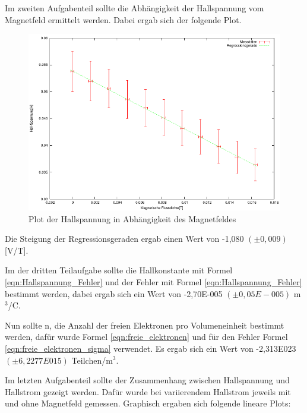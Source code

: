 \documentclass[12pt]{scrartcl}
\begin{document}
Im zweiten Aufgabenteil sollte die Abhängigkeit der Hallspannung vom Magnetfeld ermittelt werden. Dabei ergab sich der folgende Plot.

\begin{figure}[htbp] 
  \centering
    \includegraphics[scale = 1.3]{aufgabe_3_b.pdf}
  	\caption[Plot der Hallspannung in Abhängigkeit des Magnetfeldes]{Plot der Hallspannung in Abhängigkeit des Magnetfeldes}
  \label{fig:hall_mag}
\end{figure}

Die Steigung der Regressionsgeraden ergab einen Wert von -1,080	$(\pm 0,009)$ [V/T].

Im der dritten Teilaufgabe sollte die Hallkonstante mit Formel \ref{eqn:Hallspannung_Fehler} und der Fehler mit Formel \ref{eqn:Hallspannung_Fehler} bestimmt werden, dabei ergab sich ein Wert von -2,70E-005 $(\pm 0,05E-005)$ m$^3$/C.

Nun sollte n, die Anzahl der freien Elektronen pro Volumeneinheit bestimmt werden, dafür wurde Formel \ref{eqn:freie_elektronen} und für den Fehler Formel \ref{eqn:freie_elektronen_sigma} verwendet. Es ergab sich ein Wert von -2,313E023 $(\pm 6,2277E015)$ Teilchen/m$^3$.

Im letzten Aufgabenteil sollte der Zusammenhang zwischen Hallspannung und Hallstrom gezeigt werden. Dafür wurde bei variierendem Hallstrom jeweils mit und ohne Magnetfeld gemessen.
Graphisch ergaben sich folgende lineare Plots:
\end{document}
